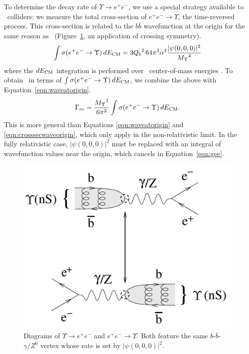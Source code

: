 \documentclass{cornell}
\begin{document}
To determine the decay rate of $\Upsilon \to e^+e^-$, we use a special
strategy available to \ee\ colliders: we measure the total
cross-section of $e^+e^- \to \Upsilon$, the time-reversed process.
This cross-section is related to the $b\bar{b}$ wavefunction at the
origin for the same reason as \gee\ (Figure~\ref{timereversed}, an
application of crossing symmetry).
\begin{equation}
  \int \sigma(e^+e^- \to \Upsilon) \, dE_{\mbox{\scriptsize CM}} = 3{Q_b}^2 \, 64
  \pi^3 \alpha^2 \frac{|\psi(0,0,0)|^2}{{M_\Upsilon}^4}
  \label{eqn:crosssecwaveorigin}
\end{equation}
where the $dE_{\mbox{\scriptsize CM}}$ integration is performed over \ee\
center-of-mass energies \cite{ps}.  To obtain \gee\ in terms of $\int
\sigma(e^+e^- \to \Upsilon) \, dE_{\mbox{\scriptsize CM}}$, we combine the above
with Equation~\ref{eqn:waveatorigin}.
\begin{equation}
  \Gamma_{ee} = \frac{{M_\Upsilon}^2}{6\pi^2} \int \sigma(e^+e^- \to
  \Upsilon) \, dE_{\mbox{\scriptsize CM}} \mbox{.}
  \label{eqn:gee}
\end{equation}
This is more general than Equations \ref{eqn:waveatorigin} and
\ref{eqn:crosssecwaveorigin}, which only apply in the non-relativistic
limit.  In the fully relativistic case, $|\psi(0,0,0)|^2$ must be
replaced with an integral of wavefunction values near the origin,
which cancels in Equation~\ref{eqn:gee}.

\begin{figure}[p]
  \begin{center}
    \includegraphics[width=0.6\linewidth]{plots/timereversed}
  \end{center}
  \caption[Diagrams of $\Upsilon \to e^+e^-$ and $e^+e^- \to
  \Upsilon$]{\label{timereversed} Diagrams of $\Upsilon \to e^+e^-$
  and $e^+e^- \to \Upsilon$.  Both feature the same
  $b$-$\bar{b}$-$\gamma/Z^0$ vertex whose rate is set by
  $|\psi(0,0,0)|^2$.}
\end{figure}
\end{document}
